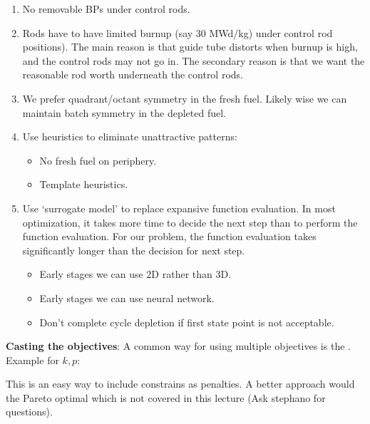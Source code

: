 \documentclass{school-22.211-notes}
\begin{document}
\begin{enumerate}

\item No removable BPs under control rods. 

\item Rods have to have limited burnup (say 30 MWd/kg) under control
  rod positions). The main reason is that guide tube distorts when
  burnup is high, and the control rods may not go in. The secondary
  reason is that we want the reasonable rod worth underneath the
  control rods.

\item We prefer quadrant/octant symmetry in the fresh fuel. Likely
  wise we can maintain batch symmetry in the depleted fuel.

\item Use heuristics to eliminate unattractive patterns: 
  \begin{itemize}
    \item No fresh fuel on periphery. 
    \item Template heuristics. 
  \end{itemize}

\item Use `surrogate model' to replace expansive function
  evaluation. In most optimization, it takes more time to decide the
  next step than to perform the function evaluation. For our problem,
  the function evaluation takes significantly longer than the decision
  for next step.
  \begin{itemize}
  \item Early stages we can use 2D rather than 3D.
  \item Early stages we can use neural network. 
  \item Don't complete cycle depletion if first state point is not
    acceptable. 
  \end{itemize}
\end{enumerate}





\clearpage
{}

\textbf{Casting the objectives}: A common way for using multiple objectives is
the . Example for $k, p$: 


This is an easy way to include constrains as penalties. A better
approach would the Pareto optimal which is not covered in this lecture
(Ask stephano for questions).
\end{document}
